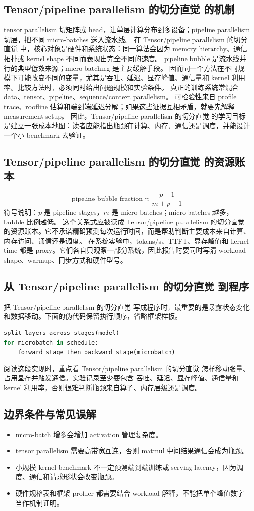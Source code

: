 \documentclass[a4paper]{article}
\begin{document}
\subsection{Tensor/pipeline parallelism 的切分直觉 的机制}
tensor parallelism 切矩阵或 head，让单层计算分布到多设备；pipeline parallelism 切层，把不同 micro-batches 送入流水线。 在 Tensor/pipeline parallelism 的切分直觉 中，核心对象是硬件和系统状态：同一算法会因为 memory hierarchy、通信拓扑或 kernel shape 不同而表现出完全不同的速度。
pipeline bubble 是流水线并行的典型低效来源；micro-batching 是主要缓解手段。 因而同一个方法在不同规模下可能改变不同的变量，尤其是吞吐、延迟、显存峰值、通信量和 kernel 利用率。比较方法时，必须同时给出问题规模和实验条件。
真正的训练系统常混合 data、tensor、pipeline、sequence/context parallelism。 可检验性来自 profile trace、roofline 估算和端到端延迟分解；如果这些证据互相矛盾，就要先解释 measurement setup。
因此，Tensor/pipeline parallelism 的切分直觉 的学习目标是建立一张成本地图：读者应能指出瓶颈在计算、内存、通信还是调度，并能设计一个小 benchmark 去验证。
\subsection{Tensor/pipeline parallelism 的切分直觉 的资源账本}
\[\text{pipeline bubble fraction}\approx\frac{p-1}{m+p-1}\]
符号说明：\(p\) 是 pipeline stages，\(m\) 是 micro-batches；micro-batches 越多，bubble 比例越低。
这个关系式应被读成 Tensor/pipeline parallelism 的切分直觉 的资源账本。它不承诺精确预测每次运行时间，而是帮助判断主要成本来自计算、内存访问、通信还是调度。
在系统实验中，tokens/s、TTFT、显存峰值和 kernel time 都是 proxy。它们各自只观察一部分系统，因此报告时要同时写清 workload shape、warmup、同步方式和硬件型号。
\subsection{从 Tensor/pipeline parallelism 的切分直觉 到程序}
把 Tensor/pipeline parallelism 的切分直觉 写成程序时，最重要的是暴露状态变化和数据移动。下面的伪代码保留执行顺序，省略框架样板。
\begin{lstlisting}[language=Python]
split_layers_across_stages(model)
for microbatch in schedule:
    forward_stage_then_backward_stage(microbatch)
\end{lstlisting}
阅读这段实现时，重点看 Tensor/pipeline parallelism 的切分直觉 怎样移动张量、占用显存并触发通信。实验记录至少要包含 吞吐、延迟、显存峰值、通信量和 kernel 利用率，否则很难判断瓶颈来自算子、内存层级还是调度。
\subsection{边界条件与常见误解}
\begin{itemize}
\item micro-batch 增多会增加 activation 管理复杂度。
\item tensor parallelism 需要高带宽互连，否则 matmul 中间结果通信会成为瓶颈。
\item 小规模 kernel benchmark 不一定预测端到端训练或 serving latency，因为调度、通信和请求形状会改变瓶颈。
\item 硬件规格表和框架 profiler 都需要结合 workload 解释，不能把单个峰值数字当作机制证明。
\end{itemize}
\end{document}
